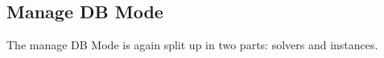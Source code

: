 \subsection{Manage DB Mode}
The manage DB Mode is again split up in two parts: solvers and instances. 

